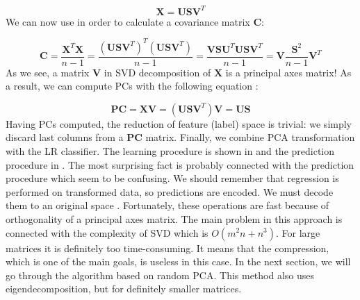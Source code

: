 \documentclass[english,a4paper,twoside]{ppfcmthesis}
\begin{document}
\begin{equation}\label{eq:pca2}
    \boldsymbol{X}=\boldsymbol{U}\boldsymbol{S}\boldsymbol{V}^{T}
\end{equation}
We can now use  in order to calculate a covariance matrix $\boldsymbol{C}$:

\begin{equation}\label{eq:pca3}
    \boldsymbol{C}=\frac{\boldsymbol{X}^T\boldsymbol{X}}{n-1} = \frac{(\boldsymbol{U}\boldsymbol{S}\boldsymbol{V}^T)^T(\boldsymbol{U}\boldsymbol{S}\boldsymbol{V}^T)}{n-1} = \frac{\boldsymbol{V}\boldsymbol{S}\boldsymbol{U}^T\boldsymbol{U}\boldsymbol{S}\boldsymbol{V}^T}{n-1} = \boldsymbol{V}\frac{\boldsymbol{S}^{2}}{n-1}\boldsymbol{V}^{T} 
\end{equation}
As we see, a matrix $\boldsymbol{V}$ in SVD decomposition of $\boldsymbol{X}$ is a principal axes matrix! As a result, we can compute PCs with the following equation \citep{Jolliffe}: 

\begin{equation}\label{eq:pca4}
    \boldsymbol{PC} = \boldsymbol{X}\boldsymbol{V} = (\boldsymbol{U}\boldsymbol{S}\boldsymbol{V}^{T})\boldsymbol{V} = \boldsymbol{U}\boldsymbol{S}
\end{equation}
Having PCs computed, the reduction of feature (label) space is trivial: we simply discard last columns from a $\boldsymbol{PC}$ matrix.  
Finally, we combine PCA transformation with the LR classifier. The learning procedure is shown in  and the prediction procedure in . The most surprising fact is probably connected with the prediction procedure which seem to be confusing. We should remember that regression is performed on transformed data, so predictions are encoded. We must decode them to an original space \citep{PLST}. Fortunately, these operations are fast because of orthogonality of a principal axes matrix. The main problem in this approach is connected with the complexity of SVD which is $O(m^2n+n^3)$. For large matrices it is definitely too time-consuming. It means that the compression, which is one of the main goals, is useless in this case. In the next section, we will go through the algorithm based on random PCA. This method also uses eigendecomposition, but for definitely smaller matrices.
\end{document}
